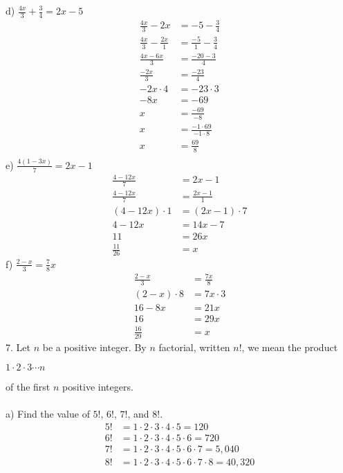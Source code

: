 \documentclass[12pt]{article}
\begin{document}
d) $\displaystyle \frac{4x}{3}+\displaystyle \frac{3}{4}=2x-5$
\begin{align*}
\displaystyle \frac{4x}{3}-2x&=-5-\displaystyle \frac{3}{4} \\
\displaystyle \frac{4x}{3}-\displaystyle \frac{2x}{1}&=\displaystyle \frac{-5}{1}-\displaystyle \frac{3}{4} \\
\displaystyle \frac{4x-6x}{3}&=\displaystyle \frac{-20-3}{4} \\
\displaystyle \frac{-2x}{3}&=\displaystyle \frac{-23}{4} \\
-2x\cdot4&=-23\cdot3 \\
-8x&=-69 \\
x&=\displaystyle \frac{-69}{-8} \\
x&=\displaystyle \frac{-1\cdot69}{-1\cdot8} \\
x&=\displaystyle \frac{69}{8} \\
\end{align*}
e) $\displaystyle \frac{4(1-3x)}{7}=2x-1$
\begin{align*}
\displaystyle \frac{4-12x}{7}&=2x-1 \\
\displaystyle \frac{4-12x}{7}&=\displaystyle \frac{2x-1}{1} \\
(4-12x)\cdot1&=(2x-1)\cdot7 \\
4-12x&=14x-7 \\
11&=26x \\
\displaystyle \frac{11}{26}&=x
\end{align*}
f) $\displaystyle \frac{2-x}{3}=\displaystyle \frac{7}{8}x$
\begin{align*}
\displaystyle \frac{2-x}{3}&=\displaystyle \frac{7x}{8} \\
(2-x)\cdot8&=7x\cdot3 \\
16-8x&=21x \\
16&=29x \\
\displaystyle \frac{16}{29}&=x
\end{align*}
7. Let $n$ be a positive integer. By $n$ factorial, written $n!$, we mean the product
\begin{center}
$1\cdot2\cdot3\cdots n$
\end{center}
of the first $n$ positive integers. \\
\\
a) Find the value of $5!$, $6!$, $7!$, and $8!$.
\begin{align*}
5!&=1\cdot2\cdot3\cdot4\cdot5=120 \\
6!&=1\cdot2\cdot3\cdot4\cdot5\cdot6=720 \\
7!&=1\cdot2\cdot3\cdot4\cdot5\cdot6\cdot7=5,040 \\
8!&=1\cdot2\cdot3\cdot4\cdot5\cdot6\cdot7\cdot8=40,320
\end{align*}
\end{document}
